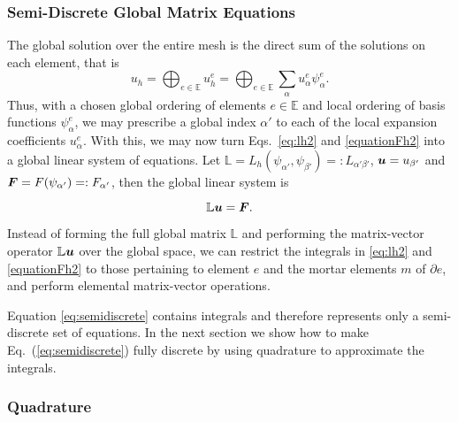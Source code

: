   \subsubsection{Semi-Discrete Global Matrix Equations}

The global solution over the entire mesh is the direct sum of the solutions on each element, that is
%
\begin{equation}\label{eq:GlobalExpansion}
  u_h = \bigoplus_{e \in \mathbb{E}} u^e_h = \bigoplus_{e \in \mathbb{E}} \sum_{\alpha}u^e_\alpha\psi^e_\alpha.
\end{equation}
%
Thus, with a chosen global ordering of elements $e \in \mathbb{E}$ and local ordering of basis functions $\psi^e_\alpha$, we may prescribe a global index $\alpha'$ to each of the local expansion coefficients $u^e_\alpha$.
With this, we may now turn Eqs.~\eqref{eq:lh2} and \eqref{equationFh2} into a global linear system of equations. Let $\mathbb{L} = L_h(\psi_{\alpha'},\psi_{\beta'}) =: L_{\alpha'\beta'}$, $\boldsymbol{u} = u_{\beta'}$ and $\boldsymbol{F} = F(\psi_{\alpha'}) =: F_{\alpha'}$, then the global linear system is

\begin{equation}\label{eq:semidiscrete}
\mathbb{L} \boldsymbol{u} = \boldsymbol{F}.
\end{equation}

Instead of forming the full global matrix $\mathbb{L}$ and performing the matrix-vector operator $\mathbb{L} \boldsymbol{u}$ over the global space, we can restrict the integrals in  \eqref{eq:lh2} and \eqref{equationFh2} to those pertaining to element $e$ and the mortar elements $m$ of $\partial e$, and perform elemental matrix-vector operations.

Equation \ref{eq:semidiscrete} contains integrals and therefore represents only a semi-discrete set of equations. In the next section we show how to make Eq.~(\ref{eq:semidiscrete}) fully discrete by using quadrature to approximate the integrals.


\subsubsection{Quadrature}
\label{sec:quadrature}

